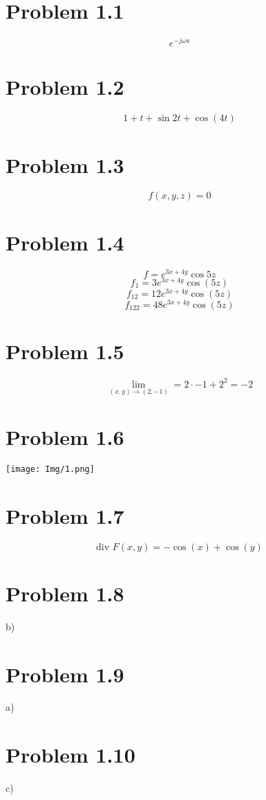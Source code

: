 \section*{Problem 1.1}
$$e^{-j\omega a}$$
\section*{Problem 1.2}
$$1+t+\sin{2t}+\cos(4t)$$
\section*{Problem 1.3}
$$f(x,y,z)=0$$
\section*{Problem 1.4}
$$f=e^{3x+4y}\cos{5z}$$
$$f_1= 3e^{3 x+4 y}\cos (5 z)$$
$$f_{12}= 12e^{3 x+4 y}\cos (5 z)$$
$$f_{122}= 48e^{3 x+4 y}\cos (5 z)$$
\section*{Problem 1.5}
$$\lim_{(x,y)\to(2,-1)}=2\cdot -1+2^2=-2$$
\section*{Problem 1.6}
\begin{center}
  \texttt{[image: Img/1.png]}
\end{center}
\section*{Problem 1.7}
$$\text{div } F(x,y)=-\cos(x)+\cos(y)$$
\section*{Problem 1.8}
b)
\section*{Problem 1.9}
a)
\section*{Problem 1.10}
c)

